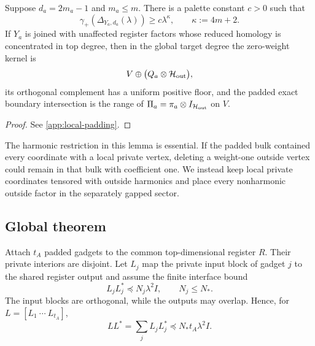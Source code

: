\begin{lemma}
\label{lem:scaling-padding}
Suppose \(d_a=2m_a-1\) and \(m_a\le m\).  There is a palette constant \(c>0\)
such that
\begin{equation}
\label{eq:local-gap}
\gamma_+\!\left(\Delta_{Y_a,d_a}(\lambda)\right)
\ge c\lambda^\kappa,\qquad \kappa:=4m+2.
\end{equation}
If \(Y_a\) is joined with unaffected register factors whose reduced homology
is concentrated in top degree, then in the global target degree the
zero-weight kernel is
\[
V\oplus\bigl(Q_a\otimes\mathcal{H}_{\rm out}\bigr),
\]
its orthogonal complement has a uniform positive floor, and the padded exact
boundary intersection is the range of
\(\Pi_a=\pi_a\otimes I_{\mathcal{H}_{\rm out}}\) on \(V\).
\end{lemma}

\begin{proof}
See \cref{app:local-padding}.
\end{proof}

The harmonic restriction in this lemma is essential.  If the padded bulk
contained every coordinate with a local private vertex, deleting a weight-one
outside vertex could remain in that bulk with coefficient one.  We instead
keep local private coordinates tensored with outside harmonics and place every
nonharmonic outside factor in the separately gapped sector.

\subsection{Global theorem}

Attach \(t_A\) padded gadgets to the common top-dimensional register \(R\).
Their private interiors are disjoint.  Let \(L_j\) map the private input block
of gadget \(j\) to the shared register output and assume the finite interface
bound
\begin{equation}
\label{eq:interface}
L_jL_j^*\preceq N_j\lambda^2I,\qquad N_j\le N_*.
\end{equation}
The input blocks are orthogonal, while the outputs may overlap.  Hence, for
\(L=[L_1\ \cdots\ L_{t_A}]\),
\[
LL^*=\sum_jL_jL_j^*\preceq N_*t_A\lambda^2I.
\]

